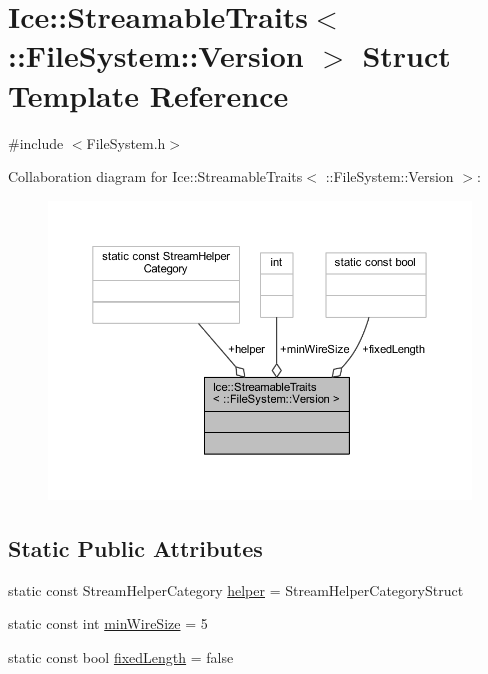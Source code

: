 \hypertarget{struct_ice_1_1_streamable_traits_3_01_1_1_file_system_1_1_version_01_4}{}\section{Ice\+:\+:Streamable\+Traits$<$ \+:\+:File\+System\+:\+:Version $>$ Struct Template Reference}
\label{struct_ice_1_1_streamable_traits_3_01_1_1_file_system_1_1_version_01_4}


{\ttfamily \#include $<$File\+System.\+h$>$}



Collaboration diagram for Ice\+:\+:Streamable\+Traits$<$ \+:\+:File\+System\+:\+:Version $>$\+:
\nopagebreak
\begin{figure}[H]
\begin{center}
\leavevmode
\includegraphics[width=350pt]{struct_ice_1_1_streamable_traits_3_01_1_1_file_system_1_1_version_01_4__coll__graph}
\end{center}
\end{figure}
\subsection*{Static Public Attributes}
\begin{DoxyCompactItemize}
\item 
static const Stream\+Helper\+Category \hyperlink{struct_ice_1_1_streamable_traits_3_01_1_1_file_system_1_1_version_01_4_add349dd746a44c2f0b7828e02bcbbb87}{helper} = Stream\+Helper\+Category\+Struct
\item 
static const int \hyperlink{struct_ice_1_1_streamable_traits_3_01_1_1_file_system_1_1_version_01_4_ade824a15ad09894f99e4e26e4ea59d12}{min\+Wire\+Size} = 5
\item 
static const bool \hyperlink{struct_ice_1_1_streamable_traits_3_01_1_1_file_system_1_1_version_01_4_a2aa04e83f01df92e2d2271004f71f744}{fixed\+Length} = false
\end{DoxyCompactItemize}


